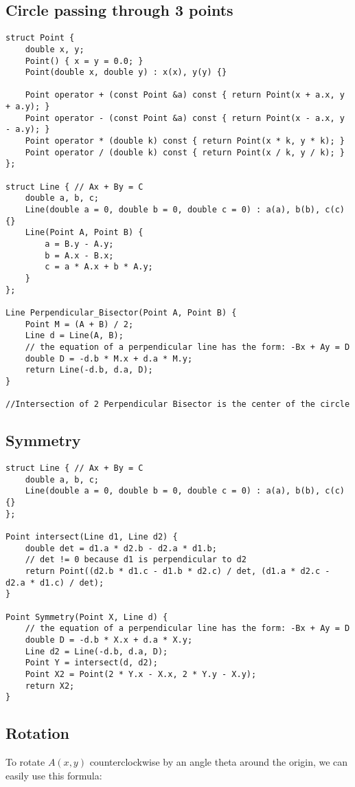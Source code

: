 \documentclass[11pt,a4paper]{article}
\begin{document}
\begin{multicols*}{2}
\subsection{Circle passing through 3 points}
\begin{lstlisting}
struct Point {
    double x, y;
    Point() { x = y = 0.0; }
    Point(double x, double y) : x(x), y(y) {}

    Point operator + (const Point &a) const { return Point(x + a.x, y + a.y); }
    Point operator - (const Point &a) const { return Point(x - a.x, y - a.y); }
    Point operator * (double k) const { return Point(x * k, y * k); }
    Point operator / (double k) const { return Point(x / k, y / k); }
};

struct Line { // Ax + By = C
    double a, b, c;
    Line(double a = 0, double b = 0, double c = 0) : a(a), b(b), c(c) {}
    Line(Point A, Point B) {
        a = B.y - A.y;
        b = A.x - B.x;
        c = a * A.x + b * A.y;
    }
};

Line Perpendicular_Bisector(Point A, Point B) {
    Point M = (A + B) / 2;
    Line d = Line(A, B);
    // the equation of a perpendicular line has the form: -Bx + Ay = D
    double D = -d.b * M.x + d.a * M.y;
    return Line(-d.b, d.a, D);
}

//Intersection of 2 Perpendicular Bisector is the center of the circle
\end{lstlisting}

\subsection{Symmetry}
\begin{lstlisting}
struct Line { // Ax + By = C
    double a, b, c;
    Line(double a = 0, double b = 0, double c = 0) : a(a), b(b), c(c) {}
};

Point intersect(Line d1, Line d2) {
    double det = d1.a * d2.b - d2.a * d1.b;
    // det != 0 because d1 is perpendicular to d2
    return Point((d2.b * d1.c - d1.b * d2.c) / det, (d1.a * d2.c - d2.a * d1.c) / det);
}

Point Symmetry(Point X, Line d) {
    // the equation of a perpendicular line has the form: -Bx + Ay = D
    double D = -d.b * X.x + d.a * X.y;
    Line d2 = Line(-d.b, d.a, D);
    Point Y = intersect(d, d2);
    Point X2 = Point(2 * Y.x - X.x, 2 * Y.y - X.y);
    return X2;
}
\end{lstlisting}

\subsection{Rotation}
To rotate $A(x, y)$ counterclockwise by an angle theta around the origin, we can easily use this formula:


\end{multicols*}
\end{document}
